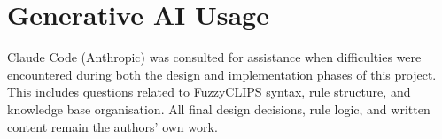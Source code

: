 \documentclass{article}
\begin{document}



\section*{Generative AI Usage}

Claude Code (Anthropic) was consulted for assistance when difficulties were encountered during both the design and implementation phases of this project. This includes questions related to FuzzyCLIPS syntax, rule structure, and knowledge base organisation. All final design decisions, rule logic, and written content remain the authors' own work.
\end{document}
